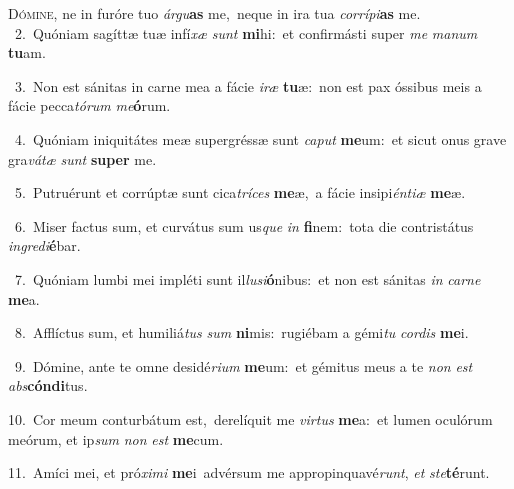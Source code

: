 \lettrine{\initial\textcolor{\initialcolor}{D}}{ómine,} ne in furóre tuo \textit{ár}\-\textit{gu}\textbf{as} me,~\star neque in ira tua \textit{cor}\-\textit{rí}\textit{pi}\textbf{as} me.\\
{\numbfont\textcolor{\numbcolor}{~2.}}~Quóniam sagíttæ tuæ infí\textit{xæ} \textit{sunt} \textbf{mi}\-hi:~\star et confirmásti super \textit{me} \textit{ma}\-\textit{num} \textbf{tu}\-am.\par
{\numbfont\textcolor{\numbcolor}{~3.}}~Non est sánitas in carne mea a fácie \textit{i}\-\textit{ræ} \textbf{tu}\-æ:~\star non est pax óssibus meis a fácie pecca\-\textit{tó}\-\textit{rum} \textit{me}\-\textbf{ó}rum.\par
{\numbfont\textcolor{\numbcolor}{~4.}}~Quóniam iniquitátes meæ supergréssæ sunt \textit{ca}\-\textit{put} \textbf{me}\-um:~\star et sicut onus grave gra\-\textit{vá}\-\textit{tæ} \textit{sunt} \textbf{su}\-\textbf{per} me.\par
{\numbfont\textcolor{\numbcolor}{~5.}}~Putruérunt et corrúptæ sunt cica\-\textit{trí}\-\textit{ces} \textbf{me}\-æ,~\star a fácie insipi\-\textit{én}\-\textit{ti}\textit{æ} \textbf{me}\-æ.\par
{\numbfont\textcolor{\numbcolor}{~6.}}~Miser factus sum, et curvátus sum us\textit{que} \textit{in} \textbf{fi}\-nem:~\star tota die contristátus \textit{in}\-\textit{gre}\textit{di}\textbf{é}bar.\par
{\numbfont\textcolor{\numbcolor}{~7.}}~Quóniam lumbi mei impléti sunt il\-\textit{lu}\-\textit{si}\textbf{ó}nibus:~\star et non est sánitas \textit{in} \textit{car}\-\textit{ne} \textbf{me}\-a.\par
{\numbfont\textcolor{\numbcolor}{~8.}}~Afflíctus sum, et humiliá\textit{tus} \textit{sum} \textbf{ni}\-mis:~\star rugiébam a gémi\textit{tu} \textit{cor}\-\textit{dis} \textbf{me}\-i.\par
{\numbfont\textcolor{\numbcolor}{~9.}}~Dómine, ante te omne desidé\-\textit{ri}\-\textit{um} \textbf{me}\-um:~\star et gémitus meus a te \textit{non} \textit{est} \textit{abs}\-\textbf{cón}\textbf{di}tus.\par
{\numbfont\textcolor{\numbcolor}{10.}}~Cor meum conturbátum est,~\dagger derelíquit me \textit{vir}\-\textit{tus} \textbf{me}\-a:~\star et lumen oculórum meórum, et ip\textit{sum} \textit{non} \textit{est} \textbf{me}\-cum.\par
{\numbfont\textcolor{\numbcolor}{11.}}~Amíci mei, et pró\-\textit{xi}\-\textit{mi} \textbf{me}\-i~\star advérsum me appropinquavé\-\textit{runt}\-, \textit{et} \textit{ste}\-\textbf{té}runt.\par
